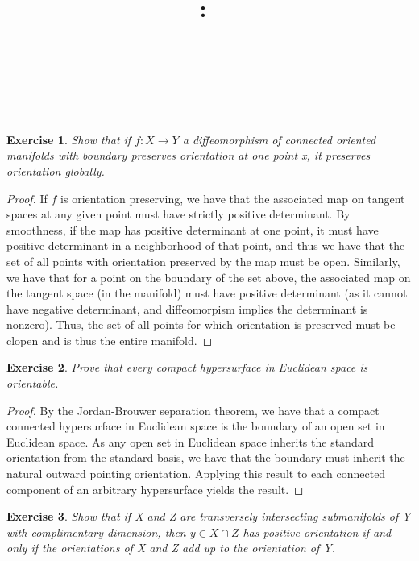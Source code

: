 \documentclass{article}
\title{
    \vspace{2in}
    \textmd{\textbf{\hmwkClass:\ \hmwkTitle}}\\
    \vspace{0.1in}
    \textmd{\hmwkDueDate} \\
    \vspace{0.2in}\large{\textit{\hmwkClassInstructor\  }}
    \vspace{2in}
}
\author{\hmwkAuthorName}
\date{}
\newtheorem{exercise}{Exercise}
\begin{document}
\maketitle

\pagebreak

\begin{exercise}
  Show that if $f: X \to Y$ a diffeomorphism of connected oriented manifolds with boundary preserves orientation at one point x, it preserves orientation globally.
\end{exercise}

\begin{proof}
  If $f$ is orientation preserving, we have that the associated map on tangent spaces at any given point must have strictly positive determinant. By smoothness, if the map has positive determinant at one point, it must have positive determinant in a neighborhood of that point, and thus we have that the set of all points with orientation preserved by the map must be open. Similarly, we have that for a point on the boundary of the set above, the associated map on the tangent space (in the manifold) must have positive determinant (as it cannot have negative determinant, and diffeomorpism implies the determinant is nonzero). Thus, the set of all points for which orientation is preserved must be clopen and is thus the entire manifold. 
\end{proof}

\begin{exercise}
  Prove that every compact hypersurface in Euclidean space is orientable.
\end{exercise}

\begin{proof}
By the Jordan-Brouwer separation theorem, we have that a compact connected hypersurface in Euclidean space is the boundary of an open set in Euclidean space. As any open set in Euclidean space inherits the standard orientation from the standard basis, we have that the boundary must inherit the natural outward pointing orientation. Applying this result to each connected component of an arbitrary hypersurface yields the result.  
\end{proof}

\begin{exercise}
  Show that if X and Z are transversely intersecting submanifolds of Y with complimentary dimension, then $y \in X \cap Z$ has positive orientation if and only if the orientations of X and Z add up to the orientation of Y. 
\end{exercise}
\end{document}
